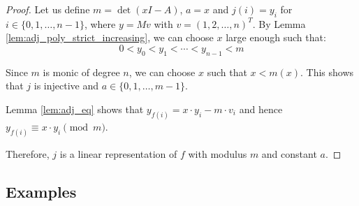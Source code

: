 \begin{proof}
\leanok
Let us define $m = \det(x I - A)$, $a = x$ and $j(i) = y_i$ for $i \in \{0,1,\ldots,n-1\}$, where $y = Mv$ with $v = (1,2,\ldots,n)^T$. 
By Lemma \ref{lem:adj_poly_strict_increasing}, we can choose $x$ large enough such that:
$$0 < y_0 < y_1 < \cdots < y_{n-1} < m$$

Since $m$ is monic of degree $n$, we can choose $x$ such that $x < m(x)$. This shows that $j$ is injective and $a \in \{0,1,\ldots,m-1\}$.

Lemma \ref{lem:adj_eq} shows that $y_{f(i)} = x\cdot y_i - m\cdot v_i$ and hence $y_{f(i)} \equiv x\cdot y_i \pmod{m}$.

Therefore, $j$ is a linear representation of $f$ with modulus $m$ and constant $a$.
\end{proof}

\subsection*{Examples}

